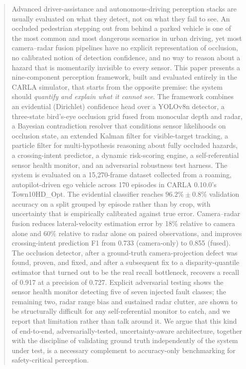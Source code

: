 \documentclass[conference]{IEEEtran}
\begin{document}
\begin{abstract}
Advanced driver-assistance and autonomous-driving perception stacks are
usually evaluated on what they detect, not on what they fail to see. An
occluded pedestrian stepping out from behind a parked vehicle is one of
the most common and most dangerous scenarios in urban driving, yet most
camera--radar fusion pipelines have no explicit representation of
occlusion, no calibrated notion of detection confidence, and no way to
reason about a hazard that is momentarily invisible to every sensor.
This paper presents a nine-component perception framework, built and
evaluated entirely in the CARLA simulator, that starts from the opposite
premise: the system should \emph{quantify and explain what it cannot
see}. The framework combines an evidential (Dirichlet) confidence head
over a YOLOv8n detector, a three-state bird's-eye occlusion grid fused
from monocular depth and radar, a Bayesian contradiction resolver that
conditions sensor likelihoods on occlusion state, an extended Kalman
filter for visible-target tracking, a particle filter for
multi-hypothesis reasoning about fully occluded hazards, a
crossing-intent predictor, a dynamic risk-scoring engine, a
self-referential sensor health monitor, and an adversarial robustness
test harness. The system is evaluated on a 15{,}270-frame dataset
collected from a roaming, autopilot-driven ego vehicle across 170
episodes in CARLA 0.10.0's Town10HD\_Opt. The evidential classifier
reaches $96.2\% \pm 0.8\%$ validation accuracy on a split grouped by
episode rather than by crop, with uncertainty that is empirically
calibrated against true error. Camera--radar fusion reduces
lateral-velocity estimation error by 18\% relative to camera alone and
60\% relative to radar alone on paired observations, and improves
crossing-intent prediction F1 from 0.733 (camera-only) to 0.855
(fused). The occlusion detector, after a ground-truth camera-projection
defect was found, proven, and fixed, and after a subsequent fix to a
disparity-quantile estimator that turned out to be the real recall
bottleneck, recovers a recall of 0.917 at a precision of 0.727. Explicit
adversarial testing shows the sensor health monitor detecting five of
seven injected fault classes; the remaining two, radar range bias and
sustained radar clutter, are shown to be structurally difficult for any
self-referential monitor to catch, and we report that limitation rather
than talk around it. We argue that this kind of end-to-end,
adversarially-tested, uncertainty-aware architecture, together with the
discipline of validating ground truth independently of the system under
test, is a necessary complement to accuracy-only benchmarking for
safety-critical perception.
\end{abstract}
\end{document}
